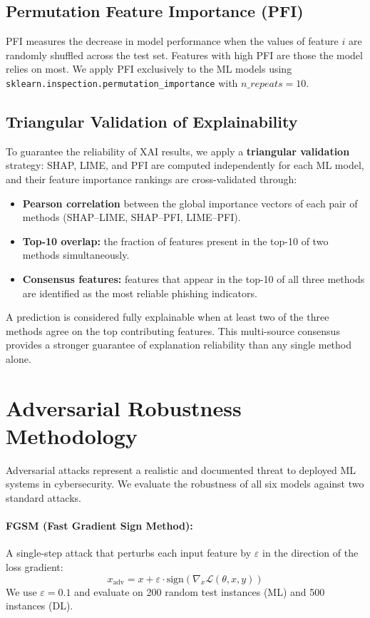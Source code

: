 \subsection{Permutation Feature Importance (PFI)}

PFI measures the decrease in model performance when the values of feature $i$ are randomly shuffled across the test set. Features with high PFI are those the model relies on most. We apply PFI exclusively to the ML models using \texttt{sklearn.inspection.permutation\_importance} with $n\_repeats = 10$.

\subsection{Triangular Validation of Explainability}

To guarantee the reliability of XAI results, we apply a \textbf{triangular validation} strategy: SHAP, LIME, and PFI are computed independently for each ML model, and their feature importance rankings are cross-validated through:
\begin{itemize}
    \item \textbf{Pearson correlation} between the global importance vectors of each pair of methods (SHAP–LIME, SHAP–PFI, LIME–PFI).
    \item \textbf{Top-10 overlap:} the fraction of features present in the top-10 of two methods simultaneously.
    \item \textbf{Consensus features:} features that appear in the top-10 of all three methods are identified as the most reliable phishing indicators.
\end{itemize}

A prediction is considered fully explainable when at least two of the three methods agree on the top contributing features. This multi-source consensus provides a stronger guarantee of explanation reliability than any single method alone.

\section{Adversarial Robustness Methodology}

Adversarial attacks represent a realistic and documented threat to deployed ML systems in cybersecurity. We evaluate the robustness of all six models against two standard attacks.

\paragraph{FGSM (Fast Gradient Sign Method):}
A single-step attack that perturbs each input feature by $\varepsilon$ in the direction of the loss gradient:
\begin{equation}
    x_{\text{adv}} = x + \varepsilon \cdot \text{sign}\left(\nabla_x \mathcal{L}(\theta, x, y)\right)
\end{equation}
We use $\varepsilon = 0.1$ and evaluate on 200 random test instances (ML) and 500 instances (DL).

